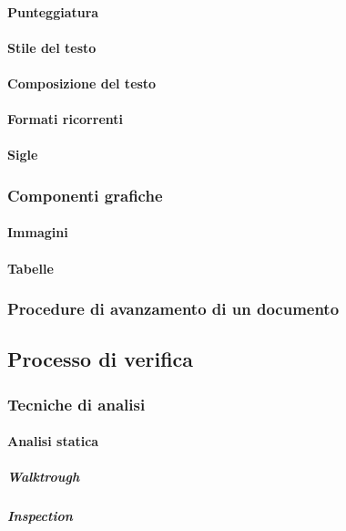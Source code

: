 \paragraph{Punteggiatura}
\paragraph{Stile del testo}
\paragraph{Composizione del testo}
\paragraph{Formati ricorrenti}
\paragraph{Sigle}

\subsubsection{Componenti grafiche}
\paragraph{Immagini}
\paragraph{Tabelle}

\subsubsection{Procedure di avanzamento di un documento}

\subsection{Processo di verifica}

\subsubsection{Tecniche di analisi}

\paragraph{Analisi statica}

\subparagraph{Walktrough}
\subparagraph{Inspection}

